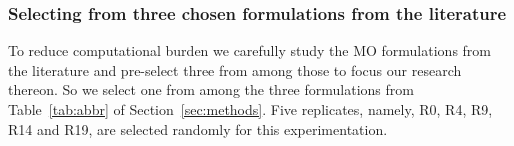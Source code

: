 \subsubsection{Selecting from three chosen formulations from the literature}
\label{sec:existing_msa_formulation}
To reduce computational burden we carefully study the MO formulations from the literature and pre-select three from among those to focus our research thereon. So we select one from among the three formulations from Table~\ref{tab:abbr} of Section~\ref{sec:methods}. 
Five replicates, namely, R0, R4, R9, R14 and R19, are selected randomly for this experimentation. 


